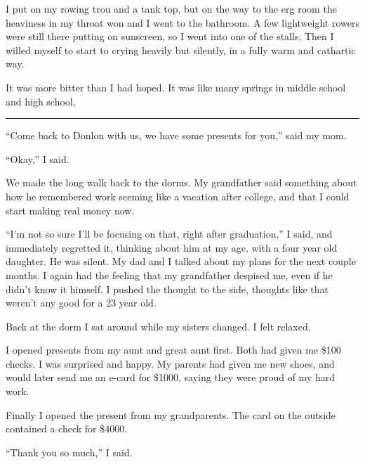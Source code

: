 I put on my rowing trou and a tank top, but on the way to the erg room the
heaviness in my throat won and I went to the bathroom.  A few lightweight
rowers were still there putting on sunscreen, so I went into one of the stalls.
Then I willed myself to start to crying heavily but silently, in a fully warm
and cathartic way.  

It was more bitter than I had hoped.  It was like many springs in middle school
and high school, 

\plainfancybreak{12pt}{2}{* * *}

``Come back to Donlon with us, we have some presents for you,'' said my mom. 

``Okay,'' I said.  

We made the long walk back to the dorms.  My grandfather said something about
how he remembered work seeming like a vacation after college, and that I could
start making real money now.

``I'm not so sure I'll be focusing on that, right after graduation,'' I said,
and immediately regretted it, thinking about him at my age, with a four year old
daughter.  He was silent.  My dad and I talked about my plans for the next
couple months.  I again had the feeling that my grandfather despised me, even if
he didn't know it himself.  I pushed the thought to the side, thoughts like that
weren't any good for a 23 year old.

Back at the dorm I sat around while my sisters changed.  I felt relaxed.

I opened presents from my aunt and great aunt first.  Both had given me \$100
checks.  I was surprised and happy.  My parents had given me new shoes, and
would later send me an e-card for \$1000, saying they were proud of my hard
work.  

Finally I opened the present from my grandparents.  The card on the outside
contained a check for \$4000.  

``Thank you so much,'' I said.
